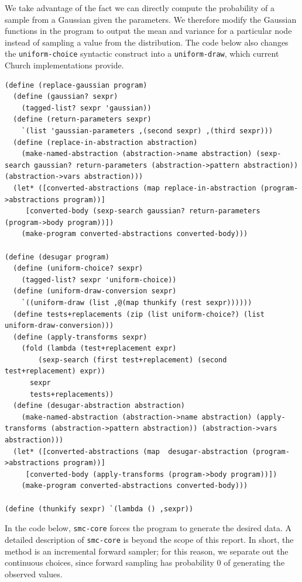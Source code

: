 \documentclass[a4paper,10pt]{article}
\begin{document}
We take advantage of the fact we can directly compute the probability of a sample from a Gaussian given the parameters.  We therefore modify the Gaussian functions in the program to output the mean and variance for a particular node instead of sampling a value from the distribution.  The code below also changes the \texttt{uniform-choice} syntactic construct into a \texttt{uniform-draw}, which current Church implementations provide.
\begin{lstlisting}[frame=trbl]
(define (replace-gaussian program)
  (define (gaussian? sexpr)
    (tagged-list? sexpr 'gaussian))
  (define (return-parameters sexpr)
    `(list 'gaussian-parameters ,(second sexpr) ,(third sexpr)))
  (define (replace-in-abstraction abstraction)
    (make-named-abstraction (abstraction->name abstraction) (sexp-search gaussian? return-parameters (abstraction->pattern abstraction)) (abstraction->vars abstraction)))
  (let* ([converted-abstractions (map replace-in-abstraction (program->abstractions program))]
	 [converted-body (sexp-search gaussian? return-parameters (program->body program))])
    (make-program converted-abstractions converted-body)))

(define (desugar program)
  (define (uniform-choice? sexpr)
    (tagged-list? sexpr 'uniform-choice))
  (define (uniform-draw-conversion sexpr)
    `((uniform-draw (list ,@(map thunkify (rest sexpr))))))
  (define tests+replacements (zip (list uniform-choice?) (list uniform-draw-conversion)))
  (define (apply-transforms sexpr)
    (fold (lambda (test+replacement expr)
	    (sexp-search (first test+replacement) (second test+replacement) expr))
	  sexpr
	  tests+replacements))
  (define (desugar-abstraction abstraction)
    (make-named-abstraction (abstraction->name abstraction) (apply-transforms (abstraction->pattern abstraction)) (abstraction->vars abstraction)))
  (let* ([converted-abstractions (map  desugar-abstraction (program->abstractions program))]
	 [converted-body (apply-transforms (program->body program))])
    (make-program converted-abstractions converted-body)))

(define (thunkify sexpr) `(lambda () ,sexpr))
\end{lstlisting}
In the code below, \texttt{smc-core} forces the program to generate the desired data.  A detailed description of \texttt{smc-core} is beyond the scope of this report. In short, the method is an incremental forward sampler; for this reason, we separate out the continuous choices, since forward sampling has probability $0$ of generating the observed values.
\end{document}

